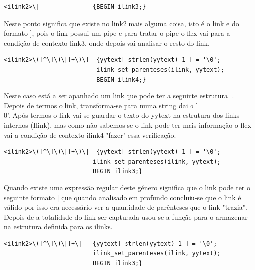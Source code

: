 \documentclass[11pt, a4paper, oneside]{article}
\begin{document}
\begin{verbatim}
<ilink2>\|               {BEGIN ilink3;}
\end{verbatim}


Neste ponto significa que existe no link2 mais alguma coisa, isto é o link e do formato \begin{math}[[Crystallite|grain boundaries]]\end{math}, pois o link possui um pipe e para tratar o pipe o flex vai para a condição de contexto link3, onde depois vai analisar o resto do link. 


\begin{verbatim}
<ilink2>\([^\]\)\|]+\)\]  {yytext[ strlen(yytext)-1 ] = '\0';
                          ilink_set_parenteses(ilink, yytext);
                          BEGIN ilink4;}

\end{verbatim}

Neste caso está a ser apanhado um link que pode ter a seguinte estrutura \begin{math}[[Opacity (optics)]]\end{math}. Depois de termos o link,  transforma-se para numa string dai o '\\0'.
Após termos o link vai-se guardar o texto do yytext na estrutura dos links internos (Ilink), mas como não sabemos se o link pode ter mais informação o flex vai a condição de contexto ilink4 "fazer" essa verificação. 

\begin{verbatim}
<ilink2>\([^\]\)\|]+\)\|  {yytext[ strlen(yytext)-1 ] = '\0';
                         ilink_set_parenteses(ilink, yytext);
                         BEGIN ilink3;}
\end{verbatim}


Quando existe uma expressão regular deste género significa que o link pode ter o seguinte formato \begin{math}[[Opacity ((optics))|]]\end{math} que quando analisado em profundo concluiu-se que o link é válido por isso era necessário ver a quantidade de parênteses que o link "trazia".
Depois de a totalidade do link ser capturada usou-se a função para o armazenar na estrutura definida para os ilinks.

\begin{verbatim}
<ilink2>\([^\]\)\|]+\|   {yytext[ strlen(yytext)-1 ] = '\0';
                         ilink_set_parenteses(ilink, yytext);
                         BEGIN ilink3;}
\end{verbatim}
\end{document}
